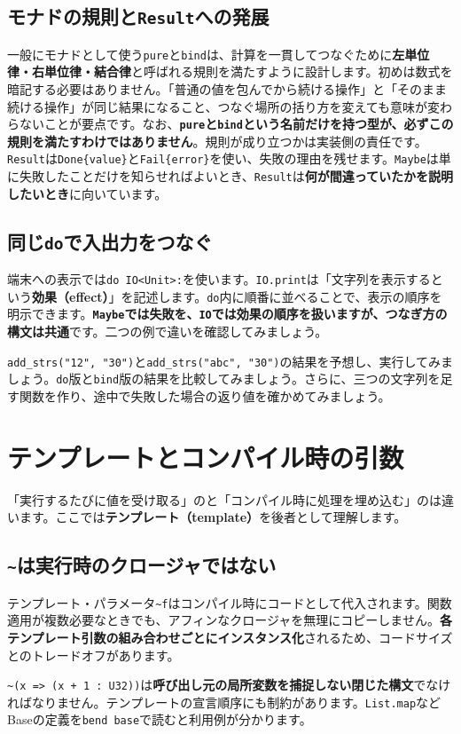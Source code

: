 \documentclass[11pt,a4paper,openany]{book}
\newcommand{\code}[1]{\texttt{#1}}
\newcommand{\term}[1]{\textbf{#1}}
\newcommand{\readcode}[2]{}
\newcommand{\exercise}[1]{\begin{exercisebox}#1\end{exercisebox}}
\begin{document}
\section{モナドの規則と\code{Result}への発展}
一般にモナドとして使う\code{pure}と\code{bind}は、計算を一貫してつなぐために\textbf{左単位律・右単位律・結合律}と呼ばれる規則を満たすように設計します。初めは数式を暗記する必要はありません。「普通の値を包んでから続ける操作」と「そのまま続ける操作」が同じ結果になること、つなぐ場所の括り方を変えても意味が変わらないことが要点です。なお、\textbf{\code{pure}と\code{bind}という名前だけを持つ型が、必ずこの規則を満たすわけではありません}。規則が成り立つかは実装側の責任です。
\code{Result}は\code{Done\{value\}}と\code{Fail\{error\}}を使い、失敗の理由を残せます。\code{Maybe}は単に失敗したことだけを知らせればよいとき、\code{Result}は\textbf{何が間違っていたかを説明したいとき}に向いています。

\section{同じ\code{do}で入出力をつなぐ}
端末への表示では\code{do IO<Unit>:}を使います。\code{IO.print}は「文字列を表示するという\term{効果（effect）}」を記述します。\code{do}内に順番に並べることで、表示の順序を明示できます。\textbf{\code{Maybe}では失敗を、\code{IO}では効果の順序を扱いますが、つなぎ方の構文は共通}です。二つの例で違いを確認してみましょう。
\exercise{\code{add\_strs("12", "30")}と\code{add\_strs("abc", "30")}の結果を予想し、実行してみましょう。\code{do}版と\code{bind}版の結果を比較してみましょう。さらに、三つの文字列を足す関数を作り、途中で失敗した場合の返り値を確かめてみましょう。}

\chapter{テンプレートとコンパイル時の引数}
\begin{tcolorbox}[colback=blue!3,colframe=blue!16,boxrule=.35pt,arc=1mm,left=3mm,right=3mm,top=2mm,bottom=2mm]
\small 「実行するたびに値を受け取る」のと「コンパイル時に処理を埋め込む」のは違います。ここでは\term{テンプレート（template）}を後者として理解します。
\end{tcolorbox}

\section{\code{\textasciitilde{}}は実行時のクロージャではない}
テンプレート・パラメータ\code{\textasciitilde{}f}はコンパイル時にコードとして代入されます。関数適用が複数必要なときでも、アフィンなクロージャを無理にコピーしません。\term{各テンプレート引数の組み合わせごとにインスタンス化}されるため、コードサイズとのトレードオフがあります。
\readcode{16_template.bend}{同じ処理を2度行うテンプレート（16\_template.bend）}
\code{\textasciitilde{}(x => (x + 1 : U32))}は\term{呼び出し元の局所変数を捕捉しない閉じた構文}でなければなりません。テンプレートの宣言順序にも制約があります。\code{List.map}などBaseの定義を\code{bend base}で読むと利用例が分かります。
\end{document}
